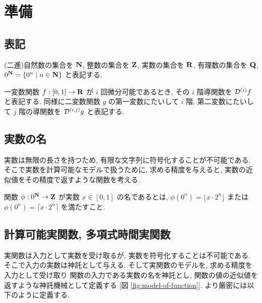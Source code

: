 \section{準備}


\subsection{表記}
(二進)自然数の集合を $\mathbf N$, 整数の集合を $\mathbf Z$, 実数の集合を $\mathbf R$, 
有理数の集合を $\mathbf Q$, $0^\mathbf N = \{0^n \mid n \in \mathbf N\}$ と表記する. 

一変数関数 $f:[0,1] \to \mathbf R$ が $i$ 回微分可能であるとき,
その $i$ 階導関数を $\mathcal D^{(i)}f$ と表記する.
同様に二変数関数 $g$ の第一変数にたいして $i$ 階, 第二変数にたいして $j$ 階の導関数を $\mathcal D^{(i,j)}g$ と表記する.

\subsection{実数の名}
 実数は無限の長さを持つため, 有限な文字列に符号化することが不可能である.
 そこで実数を計算可能なモデルで扱うために, 
 求める精度を与えると, 実数の近似値をその精度で返すような関数を考える.

\begin{definition}[実数の名]
 関数 $\phi : 0^\mathbf N \to \mathbf Z $ が実数 $x \in [0,1]$ の名であるとは,
 $\phi(0^n) = \lfloor x \cdot 2^n \rfloor$ または
 $\phi(0^n) = \lceil x \cdot 2^n \rceil$ を満たすこと.
\end{definition}

\subsection{計算可能実関数, 多項式時間実関数}
 実関数は入力として実数を受け取るが, 実数を符号化することは不可能である.
 そこで入力の実数は神託として与える.
 そして実関数のモデルを, 求める精度を入力として受け取り
 関数の入力である実数の名を神託とし, 関数の値の近似値を返すような神託機械として定義する
 [図 \ref{fig:model-of-function}].
 より厳密には以下のように定義する.

